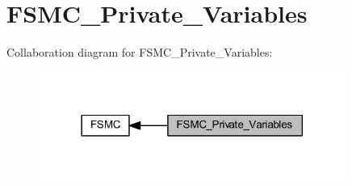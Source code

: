 \hypertarget{group___f_s_m_c___private___variables}{}\section{F\+S\+M\+C\+\_\+\+Private\+\_\+\+Variables}
\label{group___f_s_m_c___private___variables}
Collaboration diagram for F\+S\+M\+C\+\_\+\+Private\+\_\+\+Variables\+:
\nopagebreak
\begin{figure}[H]
\begin{center}
\leavevmode
\includegraphics[width=285pt]{group___f_s_m_c___private___variables}
\end{center}
\end{figure}
